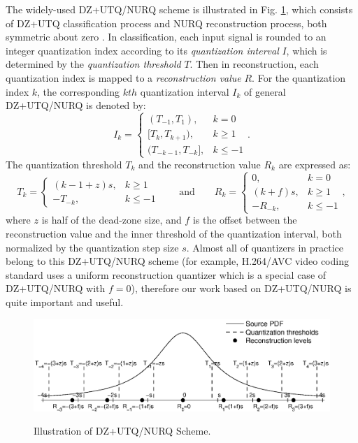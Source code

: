 \documentclass[smallabstract,smallcaptions]{dccpaper}
\begin{document}
The widely-used DZ+UTQ/NURQ scheme is illustrated in Fig. \ref{fig:DZ+UTQ_NURQ}, which consists of DZ+UTQ classification process and NURQ reconstruction process, both symmetric about zero \cite{Sullivan_VCIP2005}. In classification, each input signal is rounded to an integer quantization index according to its \emph{quantization interval} $I$, which is determined by the \emph{quantization threshold} $T$. Then in reconstruction, each quantization index is mapped to a \emph{reconstruction value} $R$. For the quantization index $k$, the corresponding $kth$ quantization interval $I_{k}$ of general DZ+UTQ/NURQ is denoted by:
\begin{equation}
\label{equ:interval}
I_{k}=\left\{ \begin{array}{ll}
(T_{-1}, T_{1}),         & k = 0 \\
{[T_{k}, T_{k+1})},        & k \ge 1 \\
(T_{-k-1}, T_{-k}],      & k \le -1
\end{array}\right. .
\end{equation}
The quantization threshold $T_{k}$ and the reconstruction value $R_{k}$ are expressed as:
\begin{equation}
\label{equ:DZ+UTQ/NURQ}
T_{k}=\left\{ \begin{array}{ll}
(k-1+z)s, & k \ge 1 \\
-T_{-k},  & k \le -1
\end{array}\right.
\qquad \textrm{and} \qquad
R_{k}=\left\{ \begin{array}{ll}
0,        & k = 0 \\
(k+f)s,   & k \ge 1 \\
-R_{-k},  & k \le -1
\end{array}\right. ,
\end{equation}
where $z$ is half of the dead-zone size, and $f$ is the offset between the reconstruction value and the inner threshold of the quantization interval, both normalized by the quantization step size $s$. Almost all of quantizers in practice belong to this DZ+UTQ/NURQ scheme (for example, H.264/AVC video coding standard uses a uniform reconstruction quantizer which is a special case of DZ+UTQ/NURQ with $f=0$), therefore our work based on DZ+UTQ/NURQ is quite important and useful.

\begin{figure}[tp]
\centering
\includegraphics[width = 1.0\linewidth]{Figures/section2/DZ+UTQ_NURQ}\\
\caption{\label{fig:DZ+UTQ_NURQ}%
Illustration of DZ+UTQ/NURQ Scheme.}
\vspace{5pt}
\end{figure}
\end{document}
